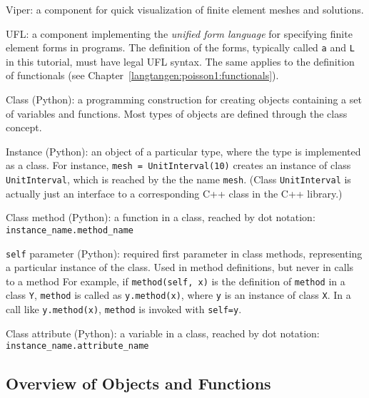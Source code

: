 Viper: a \fenics{} component for quick visualization of finite element
meshes and solutions.\gln

UFL: a \fenics{} component implementing the \emph{unified form language} 
for specifying finite element forms in \fenics{} programs.
The definition of the forms, typically called {\fontsize{12pt}{12pt}\texttt{a}} and {\fontsize{12pt}{12pt}\texttt{L}} in
this tutorial, must have legal UFL syntax. The same applies to
the definition of functionals (see Chapter~\ref{langtangen:poisson1:functionals}).
\gln

Class (Python): a programming construction for creating objects 
containing a set of
variables and functions. Most
types of \fenics{} objects are defined through the class concept.\gln

Instance (Python): an object of a particular type, where the type is
implemented as a class. For instance,
{\fontsize{12pt}{12pt}\texttt{mesh = UnitInterval(10)}} creates
an instance of class {\fontsize{12pt}{12pt}\texttt{UnitInterval}}, which is reached by the 
the name {\fontsize{12pt}{12pt}\texttt{mesh}}. (Class {\fontsize{12pt}{12pt}\texttt{UnitInterval}} is actually just 
an interface to a corresponding C++ class in the \dolfin{} C++ library.)\gln

Class method (Python): a function in a class, reached by dot notation: {\fontsize{12pt}{12pt}\verb!instance_name.method_name!}\gln

{\fontsize{12pt}{12pt}\texttt{self}} parameter (Python): required first parameter in class methods,
representing a particular instance of the class.
Used in method definitions, but never in calls to a method
For example, if {\fontsize{12pt}{12pt}\texttt{method(self, x)}} is the definition of
{\fontsize{12pt}{12pt}\texttt{method}} in a class {\fontsize{12pt}{12pt}\texttt{Y}}, {\fontsize{12pt}{12pt}\texttt{method}} is called as
{\fontsize{12pt}{12pt}\texttt{y.method(x)}}, where {\fontsize{12pt}{12pt}\texttt{y}} is an instance of class {\fontsize{12pt}{12pt}\texttt{X}}.
In a call like {\fontsize{12pt}{12pt}\texttt{y.method(x)}}, {\fontsize{12pt}{12pt}\texttt{method}} is invoked with
{\fontsize{12pt}{12pt}\texttt{self=y}}.\gln

Class attribute (Python): a variable in a class, reached by dot notation: {\fontsize{12pt}{12pt}\verb!instance_name.attribute_name!}\gln


\subsection{Overview of Objects and Functions}



